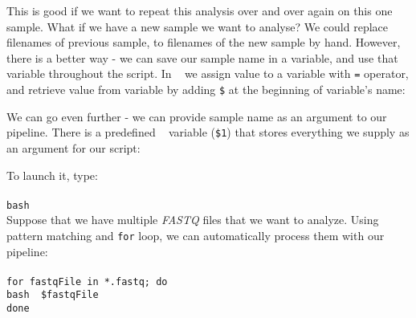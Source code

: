 This is good if we want to repeat this analysis over and over again on this one sample.
What if we have a new sample we want to analyse? We could replace filenames of previous sample,
to filenames of the new sample by hand. However, there is a better way - we can save our
sample name in a variable, and use that variable throughout the script. In \bash~
we assign value to a variable with \texttt{=} operator, and retrieve value from variable
by adding \texttt{\$} at the beginning of variable's name:


We can go even further - we can provide sample name as an argument
to our pipeline. There is a predefined \bash~ variable (\texttt{\$1})
that stores everything we supply as an argument for our script:


To launch it, type:\\~\\
\texttt{bash \pipename~\mapReads}\\

Suppose that we have multiple \textit{FASTQ} files that we want to analyze.
Using pattern matching and \texttt{for} loop, we can automatically process them with our pipeline:\\~\\
\texttt{for fastqFile in *.fastq; do \\
\indent bash \pipename~\$fastqFile \\
done
}

